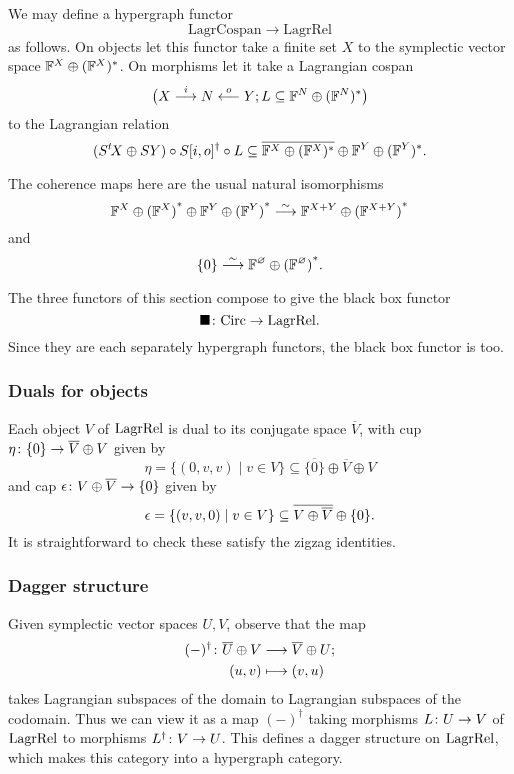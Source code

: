 \begin{proposition}
We may define a hypergraph functor
\[
  \mathrm{LagrCospan} \longrightarrow \mathrm{LagrRel}
\]
as follows. On objects let this functor take a finite set $X$ to the symplectic
vector space ${\mathbb F}^X \oplus ({\mathbb F}^X)^\ast$. On morphisms let it take a Lagrangian
cospan
\[
  \big(X\stackrel{i}{\longrightarrow} N \stackrel{o}{\longleftarrow} Y; L
  \subseteq {\mathbb F}^N \oplus ({\mathbb F}^N)^\ast\big)
\]
to the Lagrangian relation
\[
  (S^t\!X\oplus SY) \circ S[i,o]^\dagger \circ L \subseteq
  \overline{{\mathbb F}^X \oplus ({\mathbb F}^X)^\ast} \oplus {\mathbb F}^Y \oplus ({\mathbb F}^Y)^\ast.  
\]  
\end{proposition}

The coherence maps here are the usual natural isomorphisms
\[
  {{\mathbb F}^{X} \oplus {({\mathbb F}^{X})}^\ast} \oplus {{\mathbb F}^{Y} \oplus {({\mathbb F}^{Y})}^\ast} \stackrel{\sim}{\longrightarrow} {{\mathbb F}^{X+Y} \oplus {({\mathbb F}^{X+Y})}^\ast} 
\]
and
\[
  \{0\} \stackrel{\sim}{\longrightarrow} {{\mathbb F}^{\varnothing} \oplus {({\mathbb F}^{\varnothing})}^\ast}.
\]

The three functors of this section compose to give the black box functor
\[
\blacksquare{\colon} \mathrm{Circ} \to \mathrm{LagrRel}.
\] 
Since they are each separately hypergraph functors, the black box
functor is too.


\subsubsection*{Duals for objects}

Each object $V$ of $\mathrm{LagrRel}$ is dual to its conjugate space $\overline
V$, with cup $\eta{\colon} \{0\} \to \overline{V} \oplus V$ given by 
\[
  \eta = \{(0,v,v) \mid v \in V\} \subseteq \overline{\{0\}} \oplus \overline{V}
  \oplus V
\]
and cap $\epsilon{\colon} V \oplus \overline{V} \to \{0\}$ given by
\[
  \epsilon = \{(v,v,0) \mid v \in V\} \subseteq \overline{V \oplus \overline{V}}
  \oplus \{0\}.
\]
It is straightforward to check these satisfy the zigzag identities.

\subsubsection*{Dagger structure}

Given symplectic vector spaces $U,V$, observe that the map
\begin{align*}
  (-)^\dagger{\colon} \overline{U} \oplus V &\longrightarrow \overline{V} \oplus U; \\
  (u,v) &\longmapsto (v,u)
\end{align*} 
takes Lagrangian subspaces of the domain to Lagrangian subspaces of the
codomain. Thus we can view it as a map $(-)^\dagger$ taking morphisms $L{\colon} U \to V$
of $\mathrm{LagrRel}$ to morphisms $L^\dagger{\colon} V \to U$. This defines a
dagger structure on $\mathrm{LagrRel}$, which makes this category into a
hypergraph category.

